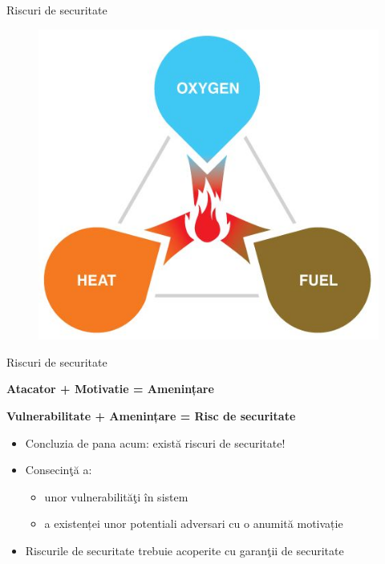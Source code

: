 \documentclass[pdf]{beamer}
\begin{document}
\begin{frame}{Riscuri de securitate}
\begin{figure}[t]
\centering
\includegraphics[scale=0.5]{Images/fire_triangle}
\end{figure}
\end{frame}



\begin{frame}{Riscuri de securitate}

\textbf{Atacator + Motivatie = Amenințare}

\textbf{Vulnerabilitate + Amenințare = Risc de securitate}

\begin{itemize}
\item
Concluzia de pana acum: există riscuri de securitate!

\item
Consecinţă a:
\begin{itemize}
\item
unor vulnerabilităţi în sistem
\item
a existenței unor potentiali adversari cu o anumită motivație
\end{itemize}

\item
Riscurile de securitate trebuie acoperite cu garanţii de securitate
\end{itemize}
\end{frame}
\end{document}
